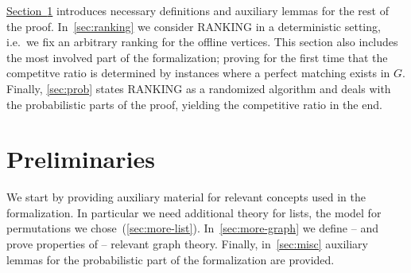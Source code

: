 \documentclass[11pt,a4paper]{article}
\begin{document}
\hyperref[sec:prelims]{Section~\ref*{sec:prelims}} introduces necessary definitions and auxiliary lemmas for the rest of the
proof. In~\autoref{sec:ranking} we consider RANKING in a deterministic setting, i.e.\ we fix
an arbitrary ranking for the offline vertices. This section also includes the most involved part
of the formalization; proving for the first time that the competitve ratio is determined by instances where a perfect
matching exists in $G$. Finally, \autoref{sec:prob} states RANKING as a randomized algorithm and
deals with the probabilistic parts of the proof, yielding the competitive ratio in the end.

\section{Preliminaries}\label{sec:prelims}
We start by providing auxiliary material for relevant concepts used in the formalization.
In particular we need additional theory for lists, the model for permutations we 
chose~(\autoref{sec:more-list}).
In~\autoref{sec:more-graph} we define -- and prove properties of -- relevant graph theory.
Finally, in~\autoref{sec:misc} auxiliary lemmas for the probabilistic part of the formalization
are provided.





\end{document}
